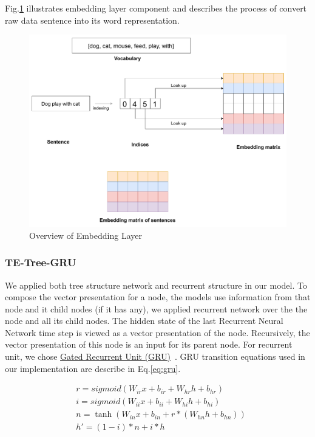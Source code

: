 Fig.\ref{fig:embeddinglayer} illustrates embedding layer component and describes the process of convert raw data sentence into its word representation.

\begin{figure}[H]
    \centering
    \includegraphics[width=0.9\linewidth]{figure/embeddinglayer.pdf}
    \caption[Overview of embedding layer]{Overview of Embedding Layer}
    \label{fig:embeddinglayer}
\end{figure}



\subsubsection{TE-Tree-GRU}
We applied both tree structure network and recurrent structure in our model.
To compose the vector presentation for a node, the models use information from that node and it child nodes (if it has any), we applied recurrent network over the the node and all its child nodes.
The hidden state of the last Recurrent Neural Network time step is viewed as a vector presentation of the node. 
Recursively, the vector presentation of this node is an input for its parent node.
For recurrent unit, we chose \hyperref[sec:GRU]{Gated Recurrent Unit (GRU)}~\cite{cho2014learning}.
GRU transition equations used in our implementation are describe in Eq.\ref{eq:gru}.

\begin{equation}
\label{eq:gru}
\begin{aligned}
&r = sigmoid(W_{ir} x + b_{ir} + W_{hr} h + b_{hr}) \\
&i = sigmoid(W_{ii} x + b_{ii} + W_{hi} h + b_{hi}) \\
&n = \tanh(W_{in} x + b_{in} + r * (W_{hn} h + b_{hn})) \\
&h' = (1 - i) * n + i * h\\
\end{aligned}
\end{equation}

